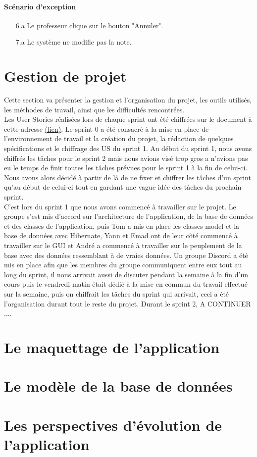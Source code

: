 \documentclass[a4paper,12pt]{article}
\begin{document}
\paragraph{Scénario d'exception}
\begin{enumerate}
    \item[6.a] Le professeur clique sur le bouton "Annuler".
    \item[7.a] Le système ne modifie pas la note.
\end{enumerate}


\section{Gestion de projet}
Cette section va présenter la gestion et l'organisation du projet, les outils utilisés, les méthodes de travail, ainsi que les difficultés rencontrées.\\
Les User Stories réalisées lors de chaque sprint ont été chiffrées sur le document à cette adresse \href{https://docs.google.com/spreadsheets/d/1I3lit2K54TSlTaCaFj2Z68BY6hvbYxaZbvtNGo1Lqdk/edit?usp=sharing}{(lien)}.
Le sprint 0 a été consacré à la mise en place de l'environnement de travail et la création du projet, la rédaction de quelques spécifications et le chiffrage des US du sprint 1.
Au début du sprint 1, nous avons chiffrés les tâches pour le sprint 2 mais nous avions visé trop gros a n'avions pas eu le temps de finir toutes les tâches prévues pour le sprint 1 à la fin de celui-ci.
Nous avons alors décidé à partir de là de ne fixer et chiffrer les tâches d'un sprint qu'au début de celui-ci tout en gardant une vague idée des tâches du prochain sprint.\\
C'est lors du sprint 1 que nous avons commencé à travailler sur le projet. Le groupe s'est mis d'accord sur l'architecture de l'application, de la base de données et des classes de l'application, puis 
Tom a mis en place les classes model et la base de données avec Hibernate, Yann et Emad ont de leur côté commencé à travailler sur le GUI et André a commencé à travailler sur le peuplement de la base avec des
données ressemblant à de vraies données. Un groupe Discord a été mis en place afin que les membres du groupe communiquent entre eux tout au long du sprint, il nous arrivait aussi de discuter pendant la semaine à la fin d'un cours
puis le vendredi matin était dédié à la mise en commun du travail effectué sur la semaine, puis on chiffrait les tâches du sprint qui arrivait, ceci a été l'organisation durant tout le reste du projet.
Durant le sprint 2, A CONTINUER ....\\
\section{Le maquettage de l’application}
\section{Le modèle de la base de données}
\section{Les perspectives d’évolution de l’application}
\end{document}
